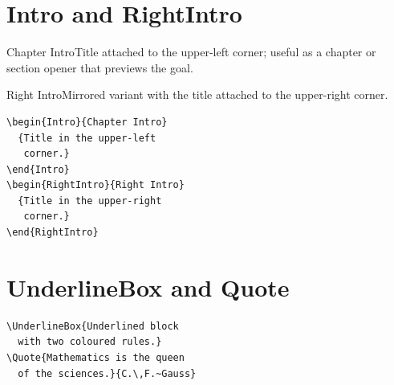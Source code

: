 \section{Intro and RightIntro}

\begin{fullwidth}
\begin{minipage}[t]{0.48\linewidth}
\begin{Intro}{Chapter Intro}{Title attached to the upper-left corner; useful as a chapter or section opener that previews the goal.}
\end{Intro}
\begin{RightIntro}{Right Intro}{Mirrored variant with the title attached to the upper-right corner.}
\end{RightIntro}
\end{minipage}\hfill
\begin{minipage}[t]{0.48\linewidth}
\begin{lstlisting}[language={[LaTeX]TeX}]
\begin{Intro}{Chapter Intro}
  {Title in the upper-left
   corner.}
\end{Intro}
\begin{RightIntro}{Right Intro}
  {Title in the upper-right
   corner.}
\end{RightIntro}
\end{lstlisting}
\end{minipage}
\end{fullwidth}

\section{UnderlineBox and Quote}

\begin{fullwidth}
\begin{minipage}[t]{0.48\linewidth}
\end{minipage}\hfill
\begin{minipage}[t]{0.48\linewidth}
\begin{lstlisting}[language={[LaTeX]TeX}]
\UnderlineBox{Underlined block
  with two coloured rules.}
\Quote{Mathematics is the queen
  of the sciences.}{C.\,F.~Gauss}
\end{lstlisting}
\end{minipage}
\end{fullwidth}

